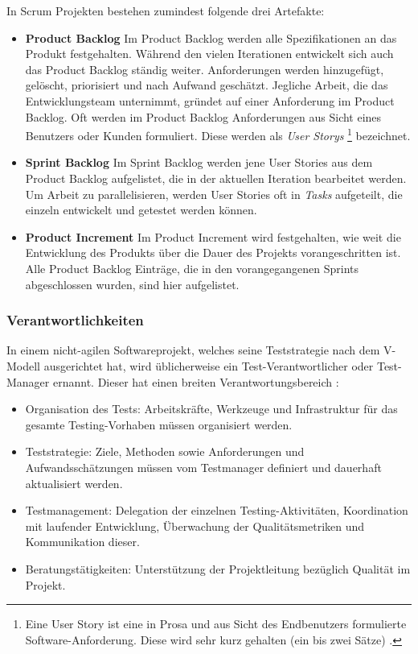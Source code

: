 In Scrum Projekten bestehen zumindest folgende drei Artefakte:

\begin{itemize}
\item \textbf{Product Backlog} Im Product Backlog werden alle Spezifikationen an das Produkt festgehalten. Während den vielen Iterationen entwickelt sich auch das Product Backlog ständig weiter. Anforderungen werden hinzugefügt, gelöscht, priorisiert und nach Aufwand geschätzt. Jegliche Arbeit, die das Entwicklungsteam unternimmt, gründet auf einer Anforderung im Product Backlog. Oft werden im Product Backlog Anforderungen aus Sicht eines Benutzers oder Kunden formuliert. Diese werden als \textit{User Storys} \footnote{Eine User Story ist eine in Prosa und aus Sicht des Endbenutzers formulierte Software-Anforderung. Diese wird sehr kurz gehalten (ein bis zwei Sätze) \cite{cohn_user_2004}.} bezeichnet.
\item \textbf{Sprint Backlog} Im Sprint Backlog werden jene User Stories aus dem Product Backlog aufgelistet, die in der aktuellen Iteration bearbeitet werden. Um Arbeit zu parallelisieren, werden User Stories oft in \textit{Tasks} aufgeteilt, die einzeln entwickelt und getestet werden können.
\item \textbf{Product Increment} Im Product Increment wird festgehalten, wie weit die Entwicklung des Produkts über die Dauer des Projekts vorangeschritten ist. Alle Product Backlog Einträge, die in den vorangegangenen Sprints abgeschlossen wurden, sind hier aufgelistet.
\end{itemize}


\subsubsection{Verantwortlichkeiten}
In einem nicht-agilen Softwareprojekt, welches seine Teststrategie nach dem V-Modell ausgerichtet hat, wird üblicherweise ein Test-Verantwortlicher oder Test-Manager ernannt. Dieser hat einen breiten Verantwortungsbereich \cite{linz_testing_2014}:

\begin{itemize}
\item Organisation des Tests: Arbeitskräfte, Werkzeuge und Infrastruktur für das gesamte Testing-Vorhaben müssen organisiert werden.
\item Teststrategie: Ziele, Methoden sowie Anforderungen und Aufwandsschätzungen müssen vom Testmanager definiert und dauerhaft aktualisiert werden.
\item Testmanagement: Delegation der einzelnen Testing-Aktivitäten, Koordination mit laufender Entwicklung, Überwachung der Qualitätsmetriken und Kommunikation dieser.
\item Beratungstätigkeiten: Unterstützung der Projektleitung bezüglich Qualität im Projekt.
\end{itemize}

